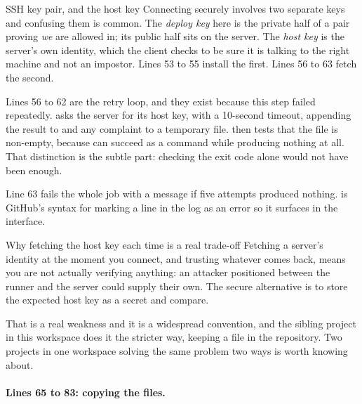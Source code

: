 \begin{jargon}{SSH key pair, and the host key}
Connecting securely involves two separate keys and confusing them is common. The
\emph{deploy key} here is the private half of a pair proving \emph{we} are allowed
in; its public half sits on the server. The \emph{host key} is the server's own
identity, which the client checks to be sure it is talking to the right machine and
not an impostor. Lines 53 to 55 install the first. Lines 56 to 63 fetch the second.
\end{jargon}

Lines 56 to 62 are the retry loop, and they exist because this step failed
repeatedly.  asks the server for its host key, with a 10-second
timeout, appending the result to  and any complaint to a
temporary file.  then tests that the file is
non-empty, because  can succeed as a command while producing
nothing at all. That distinction is the subtle part: checking the exit code alone
would not have been enough.

Line 63 fails the whole job with a message if five attempts produced nothing.
 is GitHub's syntax for marking a line in the log as an error so it
surfaces in the interface.

\begin{keyidea}{Why fetching the host key each time is a real trade-off}
Fetching a server's identity at the moment you connect, and trusting whatever comes
back, means you are not actually verifying anything: an attacker positioned between
the runner and the server could supply their own. The secure alternative is to store
the expected host key as a secret and compare.

That is a real weakness and it is a widespread convention, and the sibling project
 in this workspace does it the stricter way, keeping a
 file in the repository. Two projects in one workspace
solving the same problem two ways is worth knowing about.
\end{keyidea}

\paragraph{Lines 65 to 83: copying the files.}

